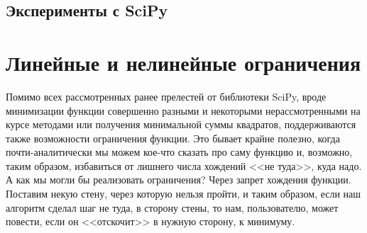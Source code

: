 \documentclass[12pt, a4paper, oneside, final]{article}
\begin{document}
	\subsection*{Эксперименты с SciPy}
	\newpage
	\section*{Линейные и нелинейные ограничения}
	Помимо всех рассмотренных ранее прелестей от библиотеки SciPy, вроде минимизации функции совершенно разными и некоторыми нерассмотренными на курсе методами или получения минимальной суммы квадратов, поддерживаются также возможности ограничения функции.
	Это бывает крайне полезно, когда почти-аналитически мы можем кое-что сказать про саму функцию и, возможно, таким образом, избавиться от лишнего числа хождений <<не туда>>, куда надо.
	А как мы могли бы реализовать ограничения?
	Через запрет хождения функции.
	Поставим некую стену, через которую нельзя пройти, и таким образом, если наш алгоритм сделал шаг не туда, в сторону стены, то нам, пользователю, может повести, если он <<отскочит>> в нужную сторону, к минимуму.
\end{document}
